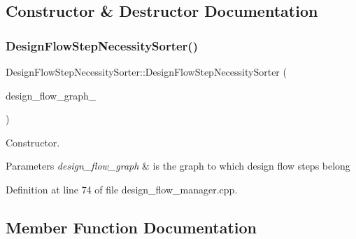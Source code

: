 \subsection{Constructor \& Destructor Documentation}
\mbox{\label{classDesignFlowStepNecessitySorter_a4242c5e0217b38fbb3a37c8e364be845}} 
\subsubsection{\texorpdfstring{Design\+Flow\+Step\+Necessity\+Sorter()}{DesignFlowStepNecessitySorter()}}
{\footnotesize\ttfamily Design\+Flow\+Step\+Necessity\+Sorter\+::\+Design\+Flow\+Step\+Necessity\+Sorter (\begin{DoxyParamCaption}\item[{const \hyperlink{design__flow__graph_8hpp_a0230319e566e6824d3d187b6871598f7}{Design\+Flow\+Graph\+Const\+Ref}}]{design\+\_\+flow\+\_\+graph\+\_\+ }\end{DoxyParamCaption})\hspace{0.3cm}{\ttfamily [explicit]}}



Constructor. 


\begin{DoxyParams}{Parameters}
{\em design\+\_\+flow\+\_\+graph} & is the graph to which design flow steps belong \\
\hline
\end{DoxyParams}


Definition at line 74 of file design\+\_\+flow\+\_\+manager.\+cpp.



\subsection{Member Function Documentation}
\mbox{\label{classDesignFlowStepNecessitySorter_a65b3cb6dfb4838ed2a42aba6e3fc0900}} 
